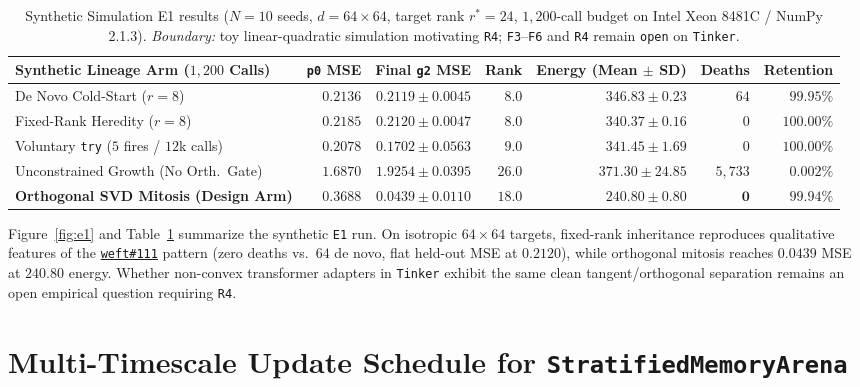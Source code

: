 \documentclass[10pt,a4paper]{article}
\begin{document}
\begin{table}[!htbp]
\centering
\caption{Synthetic Simulation E1 results ($N=10$ seeds, $d=64\times 64$, target rank $r^*=24$, $1{,}200$-call budget on Intel Xeon 8481C / NumPy 2.1.3). \emph{Boundary:} toy linear-quadratic simulation motivating \texttt{R4}; \texttt{F3}--\texttt{F6} and \texttt{R4} remain \texttt{open} on \texttt{Tinker}.}
\label{tab:e1}
\scriptsize
\setlength{\tabcolsep}{4pt}
\begin{tabularx}{\linewidth}{@{}>{\raggedright\arraybackslash}X r r r r r r@{}}
\toprule
\textbf{Synthetic Lineage Arm ($1{,}200$ Calls)} & \textbf{\texttt{p0} MSE} & \textbf{Final \texttt{g2} MSE} & \textbf{Rank} & \textbf{Energy (Mean $\pm$ SD)} & \textbf{Deaths} & \textbf{Retention} \\
\midrule
De Novo Cold-Start ($r=8$) & $0.2136$ & $0.2119 \pm 0.0045$ & $8.0$ & $346.83 \pm 0.23$ & $64$ & $99.95\%$ \\
Fixed-Rank Heredity ($r=8$) & $0.2185$ & $0.2120 \pm 0.0047$ & $8.0$ & $340.37 \pm 0.16$ & $0$ & $100.00\%$ \\
Voluntary \texttt{try} ($5$ fires / $12$k calls) & $0.2078$ & $0.1702 \pm 0.0563$ & $9.0$ & $341.45 \pm 1.69$ & $0$ & $100.00\%$ \\
Unconstrained Growth (No Orth.\ Gate) & $1.6870$ & $1.9254 \pm 0.0395$ & $26.0$ & $371.30 \pm 24.85$ & $5{,}733$ & $0.002\%$ \\
\textbf{Orthogonal SVD Mitosis (Design Arm)} & $0.3688$ & $\mathbf{0.0439 \pm 0.0110}$ & $\mathbf{18.0}$ & $\mathbf{240.80 \pm 0.80}$ & $\mathbf{0}$ & $\mathbf{99.94\%}$ \\
\bottomrule
\end{tabularx}
\end{table}

Figure~\ref{fig:e1} and Table~\ref{tab:e1} summarize the synthetic \texttt{E1} run. On isotropic $64\times 64$ targets, fixed-rank inheritance reproduces qualitative features of the \href{https://github.com/Moissanite-Labs/weft/issues/111}{\texttt{weft\#111}} pattern (zero deaths vs.\ $64$ de novo, flat held-out MSE at $0.2120$), while orthogonal mitosis reaches $0.0439$ MSE at $240.80$ energy. Whether non-convex transformer adapters in \texttt{Tinker} exhibit the same clean tangent/orthogonal separation remains an open empirical question requiring \texttt{R4}.

\section{Multi-Timescale Update Schedule for \texttt{StratifiedMemoryArena}}
\end{document}
